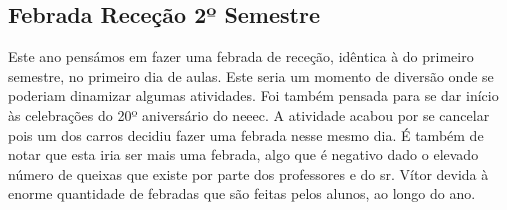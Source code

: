 
\subsection{Febrada Receção 2º Semestre}

Este ano pensámos em fazer uma febrada de receção, idêntica à do primeiro semestre, no primeiro dia de aulas. Este seria um momento de diversão onde se poderiam dinamizar algumas atividades. Foi também pensada para se dar início às celebrações do 20º aniversário do \acrshort{neeec}. A atividade acabou por se cancelar pois um dos carros decidiu fazer uma febrada nesse mesmo dia. É também de notar que esta iria ser mais uma febrada, algo que é negativo dado o elevado número de queixas que existe por parte dos professores e do sr. Vítor devida à enorme quantidade de febradas que são feitas pelos alunos, ao longo do ano.